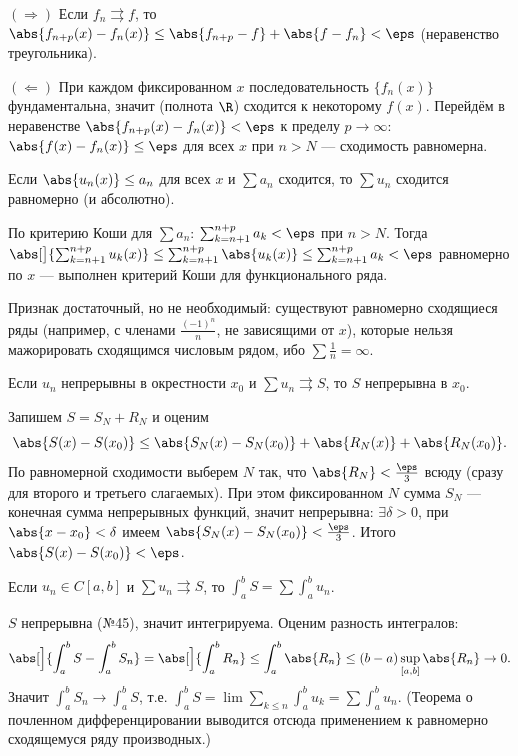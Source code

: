 \dok $(\Rightarrow)$ Если $f_n\rightrightarrows f$, то
$\abs{f_{n+p}(x)-f_n(x)}\le\abs{f_{n+p}-f}+\abs{f-f_n}<\eps$ (неравенство треугольника).

$(\Leftarrow)$ При каждом фиксированном $x$ последовательность $\{f_n(x)\}$ фундаментальна, значит
(полнота $\R$) сходится к некоторому $f(x)$. Перейдём в неравенстве $\abs{f_{n+p}(x)-f_n(x)}<\eps$ к
пределу $p\to\infty$: $\abs{f(x)-f_n(x)}\le\eps$ для всех $x$ при $n>N$ — сходимость равномерна.

\stmt Если $\abs{u_n(x)}\le a_n$ для всех $x$ и $\sum a_n$ сходится, то $\sum u_n$ сходится
равномерно (и абсолютно).

\dok По критерию Коши для $\sum a_n$: $\sum_{k=n+1}^{n+p}a_k<\eps$ при $n>N$. Тогда
$\abs[\big]{\sum_{k=n+1}^{n+p}u_k(x)}\le\sum_{k=n+1}^{n+p}\abs{u_k(x)}\le\sum_{k=n+1}^{n+p}a_k<\eps$
равномерно по $x$ — выполнен критерий Коши для функционального ряда.

Признак достаточный, но не
необходимый: существуют равномерно сходящиеся ряды (например, с членами $\tfrac{(-1)^n}{n}$,
не зависящими от $x$), которые нельзя мажорировать сходящимся числовым рядом, ибо $\sum\tfrac1n=\infty$.

\stmt Если $u_n$ непрерывны в окрестности $x_0$ и $\sum u_n\rightrightarrows S$, то $S$ непрерывна в
$x_0$.

\dok Запишем $S=S_N+R_N$ и оценим
\[
  \abs{S(x)-S(x_0)}\le\abs{S_N(x)-S_N(x_0)}+\abs{R_N(x)}+\abs{R_N(x_0)} .
\]
По равномерной сходимости выберем $N$ так, что $\abs{R_N}<\tfrac\eps3$ всюду (сразу для второго и
третьего слагаемых). При этом фиксированном $N$ сумма $S_N$ — конечная сумма непрерывных функций,
значит непрерывна: $\exists\delta>0$, при $\abs{x-x_0}<\delta$ имеем
$\abs{S_N(x)-S_N(x_0)}<\tfrac\eps3$. Итого $\abs{S(x)-S(x_0)}<\eps$.

\stmt Если $u_n\in C[a,b]$ и $\sum u_n\rightrightarrows S$, то $\int_a^b S=\sum\int_a^b u_n$.

\dok $S$ непрерывна (№45), значит интегрируема. Оценим разность интегралов:
\[
  \abs[\Big]{\int_a^b S-\int_a^b S_n}=\abs[\Big]{\int_a^b R_n}\le\int_a^b\abs{R_n}
  \le(b-a)\sup_{[a,b]}\abs{R_n}\to0 .
\]
Значит $\int_a^b S_n\to\int_a^b S$, т.е. $\int_a^b S=\lim\sum_{k\le n}\int_a^b u_k=\sum\int_a^b u_n$.
(Теорема о почленном дифференцировании выводится отсюда применением к равномерно сходящемуся ряду
производных.)

